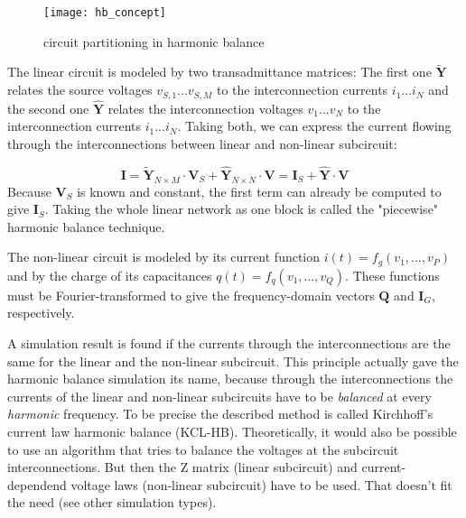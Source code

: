 \begin{figure}[ht]
\begin{center}
\texttt{[image: hb\_concept]}
\end{center}
\caption{circuit partitioning in harmonic balance}
\label{fig:hb_concept}
\end{figure}
\FloatBarrier

The linear circuit is modeled by two transadmittance matrices:
The first one $\tilde{\boldsymbol{Y}}$
relates the source voltages $v_{S,1}...v_{S,M}$ to the interconnection
currents $i_1...i_N$ and the second one $\hat{\boldsymbol{Y}}$
relates the interconnection
voltages $v_1...v_N$ to the interconnection currents $i_1...i_N$.
Taking both, we can express the current flowing through the
interconnections between linear and non-linear subcircuit:

\begin{equation}
\label{eqn:HBlin}
\boldsymbol{I}
  = \boldsymbol{\tilde{Y}}_{N\times M}\cdot \boldsymbol{V}_S +
    \boldsymbol{\hat{Y}}_{N\times N}\cdot \boldsymbol{V}
  = \boldsymbol{I}_S + \boldsymbol{\hat{Y}}\cdot \boldsymbol{V}
\end{equation}
Because $\boldsymbol{V}_S$ is known and constant, the first term
can already be computed to give $\boldsymbol{I}_S$. Taking the
whole linear network as one block is called the "piecewise"
harmonic balance technique.

\addvspace{12pt}

The non-linear circuit is modeled by its current function
$i(t) = f_g(v_1, ..., v_P)$
and by the charge of its capacitances
$q(t) = f_q(v_1, ..., v_Q)$.
These functions must be Fourier-transformed to give the
frequency-domain vectors $\boldsymbol{Q}$ and $\boldsymbol{I}_G$,
respectively.

\addvspace{12pt}

A simulation result is found if the currents through the
interconnections are the same for the linear and the non-linear
subcircuit. This principle actually gave the harmonic balance
simulation its name, because through the interconnections the
currents of the linear and non-linear subcircuits have to be
\textit{balanced} at every \textit{harmonic} frequency. To
be precise the described method is called Kirchhoff's current
law harmonic balance (KCL-HB). Theoretically, it would also be
possible to use an algorithm that tries to balance the voltages
at the subcircuit interconnections. But then the Z matrix (linear
subcircuit) and current-dependend voltage laws (non-linear
subcircuit) have to be used. That doesn't fit the need (see other
simulation types).

